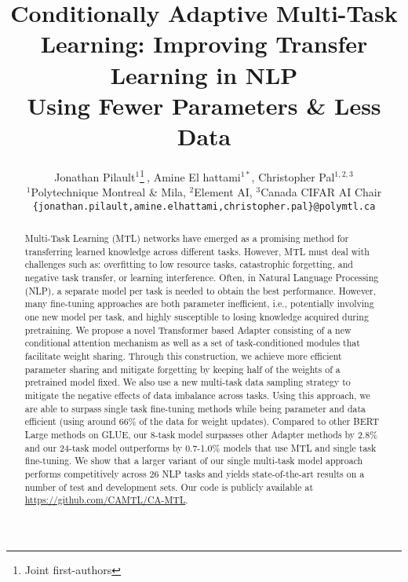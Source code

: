 \documentclass{article} \usepackage{iclr2021_conference,times}
\title{Conditionally Adaptive Multi-Task Learning: Improving Transfer Learning in NLP \\ Using Fewer Parameters \& Less Data}
\author{Jonathan Pilault$^{1}$\thanks{Joint first-authors}$\:$, Amine El hattami$^{1*}$, Christopher Pal$^{1,2,3}$ \\ 
$^1$Polytechnique Montreal \& Mila, $^2$Element AI,
$^3$Canada CIFAR AI Chair \\
\texttt{\{jonathan.pilault,amine.elhattami,christopher.pal\}@polymtl.ca}
}
\begin{document}
\maketitle

\begin{abstract}

Multi-Task Learning (MTL) networks have emerged as a promising method for transferring learned knowledge across different tasks. However, MTL must deal with challenges such as: overfitting to low resource tasks, catastrophic forgetting, and negative task transfer, or learning interference. Often, in Natural Language Processing (NLP), a separate model per task is needed to obtain the best performance. However, many fine-tuning approaches are both parameter inefficient, i.e., potentially involving one new model per task, and highly susceptible to losing knowledge acquired during pretraining. 
We propose a novel Transformer based Adapter consisting of a new conditional attention mechanism as well as a set of task-conditioned modules that facilitate weight sharing. Through this construction, we achieve more efficient parameter sharing and mitigate forgetting by keeping half of the weights of a pretrained model fixed. 
We also use a new multi-task data sampling strategy to mitigate the negative effects of data imbalance across tasks. Using this approach, we are able to surpass single task fine-tuning methods while being parameter and data efficient (using around 66\% of the data for weight updates). Compared to other BERT Large methods on GLUE, our 8-task model surpasses other Adapter methods by 2.8\% and our 24-task model outperforms by 0.7-1.0\% models that use MTL and single task fine-tuning. We show that a larger variant of our single multi-task model approach performs competitively across 26 NLP tasks and yields state-of-the-art results on a number of test and development sets. Our code is publicly available at \url{https://github.com/CAMTL/CA-MTL}.



\end{abstract}
\end{document}
